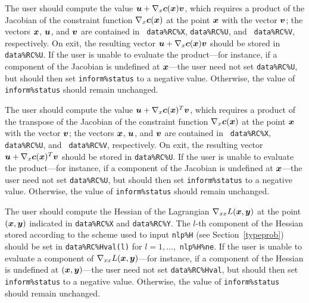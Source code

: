 \documentclass{galahad}
\begin{document}
\begin{description}
 The user should compute the value 
     ${\bm{u}} + \nabla_x {\bm{c}}({\bm{x}}){\bm{v}}$, which requires a product of the Jacobian 
     of the constraint function  $\nabla_x {\bm{c}}({\bm{x}})$ at the
     point ${\bm{x}}$ with the vector ${\bm{v}}$; the vectors
     ${\bm{x}}$, ${\bm{u}}$, and ${\bm{v}}$ are contained in {\tt
       data\%RC\%X}, {\tt data\%RC\%U}, and {\tt
       data\%RC\%V}, respectively.  On exit, the resulting
     vector ${\bm{u}} + \nabla_x {\bm{c}}({\bm{x}}){\bm{v}}$ should be stored in
     {\tt data\%RC\%U}.  If the user is
     unable to evaluate the product---for instance, 
     if a component of the Jacobian is
     undefined at ${\bm{x}}$---the user need not set {\tt data\%RC\%U}, but
     should then set {\tt inform\%status} to a negative value.
     Otherwise, the value of {\tt inform\%status} should remain
     unchanged.

 The user should compute the value 
     ${\bm{u}} + \nabla_x {\bm{c}}({\bm{x}})^T{\bm{v}}$, which requires a product of
     the transpose of the Jacobian 
     of the constraint function $\nabla_x {\bm{c}}({\bm{x}})$ at the
     point ${\bm{x}}$ with the vector ${\bm{v}}$; the vectors
     ${\bm{x}}$, ${\bm{u}}$, and ${\bm{v}}$ are contained in {\tt
       data\%RC\%X}, {\tt data\%RC\%U}, and {\tt
       data\%RC\%V}, respectively.  On exit, the resulting
     vector ${\bm{u}} + \nabla_x {\bm{c}}({\bm{x}})^T{\bm{v}}$ should be stored in
     {\tt data\%RC\%U}.  If the user is
     unable to evaluate the product---for instance, 
     if a component of the Jacobian is
     undefined at ${\bm{x}}$---the user need not set {\tt data\%RC\%U}, but
     should then set {\tt inform\%status} to a negative value.
     Otherwise, the value of {\tt inform\%status} should remain
     unchanged.

 The user should compute the Hessian 
     of the Lagrangian $\nabla_{xx} L({\bm{x}},{\bm{y}})$ at the point $({\bm{x}},{\bm{y}})$ 
     indicated in {\tt data\%RC\%X} and {\tt data\%RC\%Y}.
     The $l$-th component of the Hessian stored according to the
     scheme used to input {\tt nlp\%H} (see Section~\ref{typeprob})
     should be set in {\tt data\%RC\%Hval(l)} 
     for $l = 1, \ldots,$ {\tt  nlp\%H\%ne}.  If the user is
     unable to evaluate a component of $\nabla_{xx} L({\bm{x}},{\bm{y}})$---for instance, 
     if a component of the Hessian is
     undefined at $({\bm{x}},{\bm{y}})$---the user need not set {\tt data\%RC\%Hval}, but
     should then set {\tt inform\%status} to a negative value.
     Otherwise, the value of {\tt inform\%status} should remain
     unchanged.


\end{description}
\end{document}
